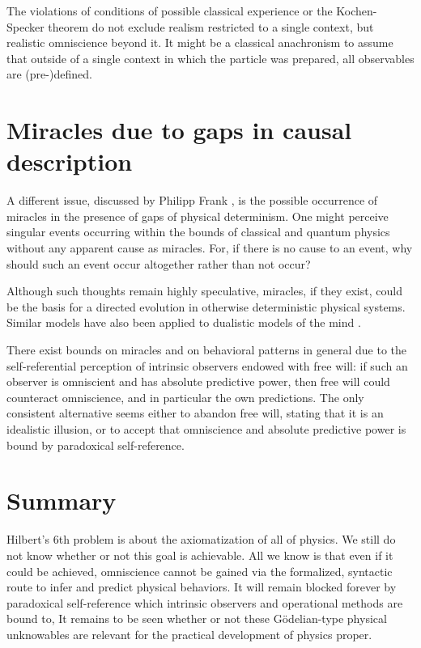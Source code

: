 \documentclass[rmp,amsfonts,showpacs,showkeys]{revtex4}
\begin{document}
The violations of conditions of possible classical experience or
the Kochen-Specker theorem do not exclude realism restricted to a single context,
but realistic omniscience beyond it.
It might be a classical anachronism to assume that outside of a single context
in which the particle was prepared, all observables are (pre-)defined.


\section{Miracles due to gaps in causal description}

A different issue, discussed by Philipp Frank \cite{frank},
is the possible occurrence of miracles in the presence of gaps of physical determinism.
One might perceive singular events occurring
within the bounds of classical and quantum physics without any apparent cause as miracles.
For, if there is no cause to an event,
why should such an event occur altogether rather than not occur?

Although such thoughts remain highly speculative, miracles,
if they exist,
could be the basis for a directed evolution in otherwise deterministic physical systems.
Similar models have also been applied to dualistic models of the mind \cite{eccles:papal,popper-eccles}.

There exist bounds on miracles and on behavioral patterns in general due to the self-referential
perception of intrinsic observers endowed with free will:
if such an observer is omniscient and has absolute predictive power,
then free will could counteract omniscience, and in particular the own predictions.
The only consistent alternative seems either to abandon free will,
stating that it is an idealistic illusion,
or to accept that omniscience and absolute predictive power is bound by paradoxical self-reference.

\section{Summary}


Hilbert's 6th problem is about the axiomatization of all of physics.
We still do not know whether or not this goal is achievable.
All we know is that even if it could be achieved, omniscience cannot be gained
via the formalized, syntactic route to infer and predict physical behaviors.
It will remain blocked forever by paradoxical self-reference
which intrinsic observers and operational methods are bound to,
It remains to be seen whether or not these G\"odelian-type physical unknowables
are relevant for the practical development of physics proper.



\end{document}
